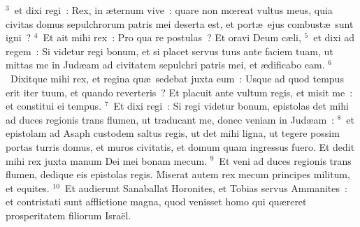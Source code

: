 ${}^{3}$~et dixi regi~: Rex, in \ae ternum vive~: quare non mœreat vultus meus, quia civitas domus sepulchrorum patris mei deserta est, et port\ae\ ejus combust\ae\ sunt igni~?
${}^{4}$~Et ait mihi rex~: Pro qua re postulas~? Et oravi Deum c\ae li,
${}^{5}$~et dixi ad regem~: Si videtur regi bonum, et si placet servus tuus ante faciem tuam, ut mittas me in Jud\ae am ad civitatem sepulchri patris mei, et \ae dificabo eam.
${}^{6}$~Dixitque mihi rex, et regina qu\ae\ sedebat juxta eum~: Usque ad quod tempus erit iter tuum, et quando reverteris~? Et placuit ante vultum regis, et misit me~: et constitui ei tempus.
${}^{7}$~Et dixi regi~: Si regi videtur bonum, epistolas det mihi ad duces regionis trans flumen, ut traducant me, donec veniam in Jud\ae am~:
${}^{8}$~et epistolam ad Asaph custodem saltus regis, ut det mihi ligna, ut tegere possim portas turris domus, et muros civitatis, et domum quam ingressus fuero. Et dedit mihi rex juxta manum Dei mei bonam mecum.
${}^{9}$~Et veni ad duces regionis trans flumen, dedique eis epistolas regis. Miserat autem rex mecum principes militum, et equites.
${}^{10}$~Et audierunt Sanaballat Horonites, et Tobias servus Ammanites~: et contristati sunt afflictione magna, quod venisset homo qui qu\ae reret prosperitatem filiorum Isra\"el.


